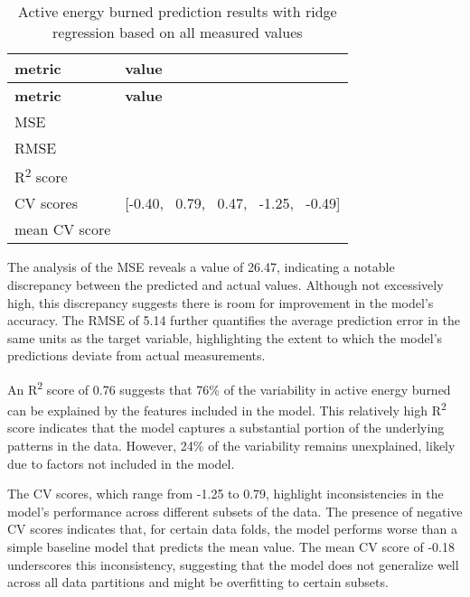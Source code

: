 \begin{table}[H]
\begin{longtable}{|>{\raggedright}p{4cm}|>{\raggedright\arraybackslash}p{10cm}|}
\hline
\textbf{metric} & \textbf{value} \\
\hline
\endfirsthead
\hline
\textbf{metric} & \textbf{value} \\
\hline
\endhead
\hline
\endfoot
MSE & 26.47 \\
\hline
RMSE & 5.14 \\
\hline
R\textsuperscript{2} score & 0.76 \\
\hline
CV scores &
\begin{minipage}[t]{10cm}
[-0.40, \ 0.79, \ 0.47, \ -1.25, \ -0.49]
\end{minipage}
\\
\hline
mean CV score & -0.18 \\
\hline
\end{longtable}
\caption{Active energy burned prediction results with ridge regression based on all measured values}
\label{tab:RRcaloriesallfeatures}
\end{table}

The analysis of the MSE reveals a value of 26.47, indicating a notable discrepancy between the predicted and actual values. Although not excessively high, this discrepancy suggests there is room for improvement in the model's accuracy. The RMSE of 5.14 further quantifies the average prediction error in the same units as the target variable, highlighting the extent to which the model's predictions deviate from actual measurements.

An R\textsuperscript{2} score of 0.76 suggests that 76\% of the variability in active energy burned can be explained by the features included in the model. This relatively high R\textsuperscript{2} score indicates that the model captures a substantial portion of the underlying patterns in the data. However, 24\% of the variability remains unexplained, likely due to factors not included in the model.

The CV scores, which range from -1.25 to 0.79, highlight inconsistencies in the model's performance across different subsets of the data. The presence of negative CV scores indicates that, for certain data folds, the model performs worse than a simple baseline model that predicts the mean value. The mean CV score of -0.18 underscores this inconsistency, suggesting that the model does not generalize well across all data partitions and might be overfitting to certain subsets.

